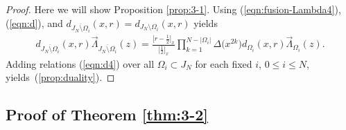 \documentclass[pdftex]{sigma}
\numberwithin{equation}{section}
\begin{document}
\begin{proof}
Here we will show Proposition \ref{prop:3-1}.
Using (\ref{eqn:fusion-Lambda4}), (\ref{eqn:d}), and $d_{\overline{J_N \setminus \Omega_i}}(x,r)=d_{J_N \setminus \Omega_i}(x,r)$ yields
\begin{gather}
d_{\overline{J_N \setminus \Omega_i}}(x,r)\overrightarrow{\Lambda}_{\overline{J_N \setminus \Omega_i}}(z)=\frac{\big[r-\frac{1}{2}\big]_x}{\big[\frac{1}{2}\big]_x}
\prod_{k=1}^{N-|{\Omega_i}|}\Delta\big(x^{2k}\big) d_{{\Omega_i}}(x,r)
\overrightarrow{\Lambda}_{{\Omega_i}}(z).
\label{eqn:d4}
\end{gather}
{Adding {relations} (\ref{eqn:d4}) over all $\Omega_i \subset J_N$
for each fixed $i$, $0\leq i \leq N$, yields~(\ref{prop:duality})}.
\end{proof}

\subsection{Proof of Theorem \ref{thm:3-2}}
\end{document}
